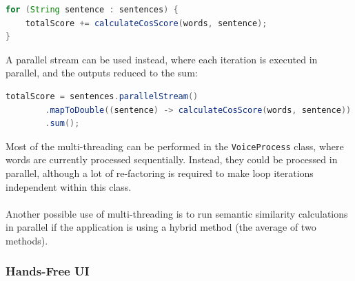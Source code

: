 \documentclass[11pt]{article}
\begin{document}
\begin{lstlisting}[language=Java, label=lst:loop-seq]
for (String sentence : sentences) {
    totalScore += calculateCosScore(words, sentence);
}
\end{lstlisting}

A parallel stream can be used instead, where each iteration is executed in parallel, and the outputs reduced to the sum:

\begin{lstlisting}[language=Java, label=lst:loop-stream]
totalScore = sentences.parallelStream()
        .mapToDouble((sentence) -> calculateCosScore(words, sentence))
        .sum();
\end{lstlisting}

Most of the multi-threading can be performed in the \texttt{VoiceProcess} class, where words are currently processed sequentially. Instead, they could be processed in parallel, although a lot of re-factoring is required to make loop iterations independent within this class.
\\
\\
Another possible use of multi-threading is to run semantic similarity calculations in parallel if the application is using a hybrid method (the average of two methods).

\subsubsection{Hands-Free UI}
\end{document}
